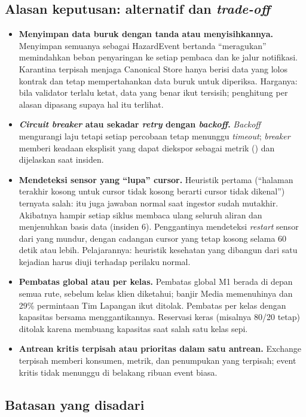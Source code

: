 \documentclass{fairmeta}
\newcommand{\code}[1]{\texttt{\detokenize{#1}}}
\newcommand{\en}[1]{\textit{#1}}
\begin{document}
\subsection{Alasan keputusan: alternatif dan \en{trade-off}}

\begin{itemize}
  \item \textbf{Menyimpan data buruk dengan tanda atau menyisihkannya.} Menyimpan semuanya sebagai HazardEvent bertanda ``meragukan'' memindahkan beban penyaringan ke setiap pembaca dan ke jalur notifikasi. Karantina terpisah menjaga Canonical Store hanya berisi data yang lolos kontrak dan tetap mempertahankan data buruk untuk diperiksa. Harganya: bila validator terlalu ketat, data yang benar ikut tersisih; penghitung per alasan dipasang supaya hal itu terlihat.
  \item \textbf{\en{Circuit breaker} atau sekadar \en{retry} dengan \en{backoff}.} \en{Backoff} mengurangi laju tetapi setiap percobaan tetap menunggu \en{timeout}; \en{breaker} memberi keadaan eksplisit yang dapat diekspor sebagai metrik (\code{coastal_circuit_state}) dan dijelaskan saat insiden.
  \item \textbf{Mendeteksi sensor yang ``lupa'' cursor.} Heuristik pertama (``halaman terakhir kosong untuk cursor tidak kosong berarti cursor tidak dikenal'') ternyata salah: itu juga jawaban normal saat ingestor sudah mutakhir. Akibatnya hampir setiap siklus membaca ulang seluruh aliran dan menjenuhkan basis data (insiden 6). Penggantinya mendeteksi \en{restart} sensor dari \code{generated_at} yang mundur, dengan cadangan cursor yang tetap kosong selama 60 detik atau lebih. Pelajarannya: heuristik kesehatan yang dibangun dari satu kejadian harus diuji terhadap perilaku normal.
  \item \textbf{Pembatas global atau per kelas.} Pembatas global M1 berada di depan semua rute, sebelum kelas klien diketahui; banjir Media memenuhinya dan 29\% permintaan Tim Lapangan ikut ditolak. Pembatas per kelas dengan kapasitas bersama menggantikannya. Reservasi keras (misalnya 80/20 tetap) ditolak karena membuang kapasitas saat salah satu kelas sepi.
  \item \textbf{Antrean kritis terpisah atau prioritas dalam satu antrean.} Exchange terpisah memberi konsumen, metrik, dan penumpukan yang terpisah; event kritis tidak menunggu di belakang ribuan event biasa.
\end{itemize}

\subsection{Batasan yang disadari}
\end{document}

